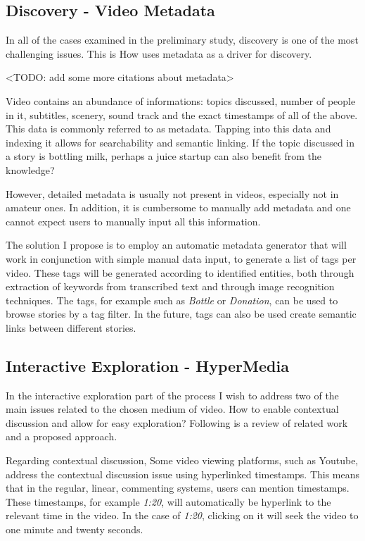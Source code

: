 \subsection{Discovery - Video Metadata}
In all of the cases examined in the preliminary study, discovery is one of the most challenging issues. This is How uses metadata as a driver for discovery. 

<TODO: add some more citations about metadata>

Video contains an abundance of informations: topics discussed, number of people in it, subtitles, scenery, sound track and the exact timestamps of all of the above. This data is commonly referred to as metadata. Tapping into this data and indexing it allows for searchability and semantic linking. If the topic discussed in a story is bottling milk, perhaps a juice startup can also benefit from the knowledge?

However, detailed metadata is usually not present in videos, especially not in amateur ones. In addition, it is cumbersome to manually add metadata and one cannot expect users to manually input all this information.

The solution I propose is to employ an automatic metadata generator that will work in conjunction with simple manual data input, to generate a list of tags per video. These tags will be generated according to identified entities, both through extraction of keywords from transcribed text and through image recognition techniques. The tags, for example such as \textit{Bottle} or \textit{Donation}, can be used to browse stories by a tag filter. In the future, tags can also be used create semantic links between different stories.

\subsection{Interactive Exploration - HyperMedia}

In the interactive exploration part of the process I wish to address two of the main issues related to the chosen medium of video. How to enable contextual discussion and allow for easy exploration? Following is a review of related work and a proposed approach. 

Regarding contextual discussion, Some video viewing platforms, such as Youtube, address the contextual discussion issue using hyperlinked timestamps. This means that in the regular, linear, commenting systems, users can mention timestamps. These timestamps, for example  \textit{1:20}, will automatically be hyperlink to the relevant time in the video. In the case of \textit{1:20}, clicking on it will seek the video to one minute and twenty seconds. 

